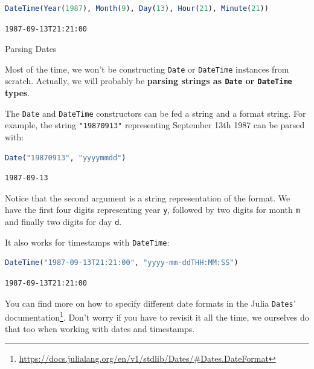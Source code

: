 \documentclass[
  notoc %
]{tufte-book}
\makeatletter
\DeclareRobustCommand{\href}[2]{#2\footnote{\url{#1}}}
\newcommand{\passthrough}[1]{#1}
\renewcommand\subsubsection{%
\@startsection{subsubsection}{3}{\z@ }{-3.25ex\@plus -1ex \@minus -.2ex}{1.5ex \@plus .2ex}{\normalfont \normalsize \bfseries }
}
\makeatother
\begin{document}
\begin{lstlisting}[language=Julia]
DateTime(Year(1987), Month(9), Day(13), Hour(21), Minute(21))
\end{lstlisting}

\begin{lstlisting}[language=Output]
1987-09-13T21:21:00
\end{lstlisting}

\hypertarget{sec:dates_parsing}{%
\subsubsection{Parsing Dates}\label{sec:dates_parsing}}

Most of the time, we won't be constructing
\passthrough{\lstinline!Date!} or \passthrough{\lstinline!DateTime!}
instances from scratch. Actually, we will probably be \textbf{parsing
strings as \passthrough{\lstinline!Date!} or
\passthrough{\lstinline!DateTime!} types}.

The \passthrough{\lstinline!Date!} and
\passthrough{\lstinline!DateTime!} constructors can be fed a string and
a format string. For example, the string
\passthrough{\lstinline!"19870913"!} representing September 13th 1987
can be parsed with:

\begin{lstlisting}[language=Julia]
Date("19870913", "yyyymmdd")
\end{lstlisting}

\begin{lstlisting}[language=Output]
1987-09-13
\end{lstlisting}

Notice that the second argument is a string representation of the
format. We have the first four digits representing year
\passthrough{\lstinline!y!}, followed by two digits for month
\passthrough{\lstinline!m!} and finally two digits for day
\passthrough{\lstinline!d!}.

It also works for timestamps with \passthrough{\lstinline!DateTime!}:

\begin{lstlisting}[language=Julia]
DateTime("1987-09-13T21:21:00", "yyyy-mm-ddTHH:MM:SS")
\end{lstlisting}

\begin{lstlisting}[language=Output]
1987-09-13T21:21:00
\end{lstlisting}

You can find more on how to specify different date formats in the
\href{https://docs.julialang.org/en/v1/stdlib/Dates/\#Dates.DateFormat}{Julia
\passthrough{\lstinline!Dates!}' documentation}. Don't worry if you have
to revisit it all the time, we ourselves do that too when working with
dates and timestamps.
\end{document}

